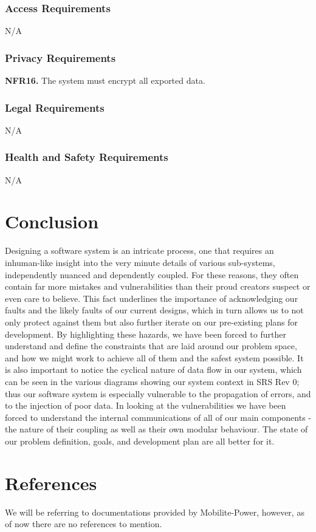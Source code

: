 \documentclass[12pt, titlepage]{article}
\begin{document}
\subsubsection{Access Requirements}
N/A

\subsubsection{Privacy Requirements}
\textbf{NFR16.} The system must encrypt all exported data.


\subsubsection{Legal Requirements}
N/A

\subsubsection{Health and Safety Requirements}
N/A

\section{Conclusion}
Designing a software system is an intricate process, one that requires an inhuman-like insight into the very minute details of various sub-systems, independently nuanced and dependently coupled. For these reasons, they often contain far more mistakes and vulnerabilities than their proud creators suspect or even care to believe. This fact underlines the importance of acknowledging our faults and the likely faults of our current designs, which in turn allows us to not only protect against them but also further iterate on our pre-existing plans for development. By highlighting these hazards, we have been forced to further understand and define the constraints that are laid around our problem space, and how we might work to achieve all of them and the safest system possible. It is also important to notice the cyclical nature of data flow in our system, which can be seen in the various diagrams showing our system context in SRS Rev 0; thus our software system is especially vulnerable to the propagation of errors, and to the injection of poor data. In looking at the vulnerabilities we have been forced to understand the internal communications of all of our main components - the nature of their coupling as well as their own modular behaviour. The state of our problem definition, goals, and development plan are all better for it.

\section*{References}
We will be referring to documentations provided by Mobilite-Power, however, as of now there are no references to mention.
\end{document}
